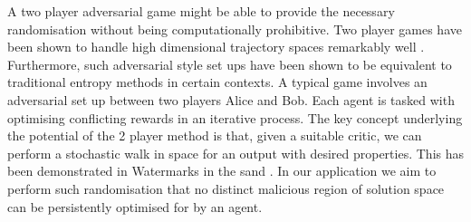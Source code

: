 A two player adversarial game might be able to provide the necessary randomisation without being computationally prohibitive. Two player games have been shown to handle high dimensional trajectory spaces remarkably well \citep{finn_connection_2016,fu_learning_2018}. Furthermore, such adversarial style set ups have been shown to be equivalent to traditional entropy methods in certain contexts. A typical game involves an adversarial set up between two players Alice and Bob. Each agent is tasked with optimising conflicting rewards in an iterative process. The key concept underlying the potential of the 2 player method is that, given a suitable critic, we can perform a stochastic walk in space for an output with desired properties. This has been demonstrated in Watermarks in the sand \citep{zhang_watermarks_2025}. In our application we aim to perform such randomisation that no distinct malicious region of solution space can be persistently optimised for by an agent.




